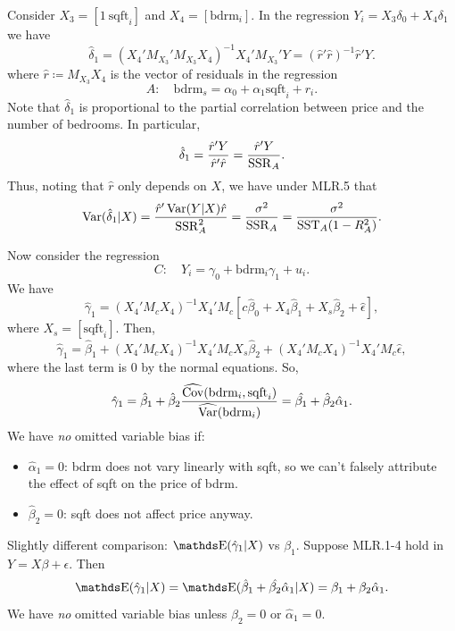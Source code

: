 \documentclass[letterpaper, 10pt]{article}
\begin{document}
\begin{example}
  Consider \(X_3 = [1 \  \text{sqft}_i]\) and \(X_4 = [\text{bdrm}_i]\).
  In the regression \(Y_i = X_3 \delta_0 + X_4 \delta_1\) we have
  \[
    \hat{\delta}_1
    = (X_4' M_{X_3}' M_{X_3} X_4)^{-1} X_4' M_{X_3}' Y
    = (\hat{r}' \hat{r})^{-1} \hat{r}' Y.
  \]
  where \(\hat{r} \coloneqq M_{X_3} X_4\) is the vector of residuals in the regression
  \[
    A: \quad \text{bdrm}_s = \alpha_0 + \alpha_1 \text{sqft}_i + r_i.
  \]
  Note that \(\hat{\delta}_1\) is proportional to the partial correlation between price and the number of bedrooms.
  In particular,
  \[
    \hat{\delta}_1
    = \frac{\hat{r}' Y}{\hat{r}' \hat{r}}
    = \frac{\hat{r}' Y}{\operatorname{SSR}_A}.
  \]
  Thus, noting that \(\hat{r}\) only depends on \(X\), we have under MLR.5 that
  \[
    \operatorname{Var}(\hat{\delta}_1 | X)
    = \frac{\hat{r}' \operatorname{Var}(Y|X) \hat{r}}{\operatorname{SSR}_A^2}
    = \frac{\sigma^2}{\operatorname{SSR}_A}
    = \frac{\sigma^2}{\operatorname{SST}_A(1 - R_A^2)}.
  \]

  Now consider the regression
  \[
    C:\quad
    Y_i = \gamma_0 + \text{bdrm}_i \gamma_1 + u_i.
  \]
  We have
  \[
    \hat{\gamma}_1 = (X_4' M_c X_4)^{-1} X_4' M_c [c \hat{\beta}_0 + X_4 \hat{\beta}_1 + X_s \hat{\beta}_2 + \hat{\epsilon}],
  \]
  where \(X_s = [\text{sqft}_i]\).
  Then,
  \[
    \hat{\gamma}_1
    = \hat{\beta}_1 + (X_4' M_c X_4)^{-1} X_4' M_c X_s \hat{\beta}_2 + (X_4' M_c X_4)^{-1} X_4' M_c \hat{\epsilon},
  \]
  where the last term is \(0\) by the normal equations.
  So,
  \[
    \hat{\gamma}_1
    = \hat{\beta}_1 + \hat{\beta}_2 \frac{\widehat{\operatorname{Cov}}(\text{bdrm}_i, \text{sqft}_i)}{\widehat{\operatorname{Var}}(\text{bdrm}_i)}
    = \hat{\beta_1} + \hat{\beta}_2 \hat{\alpha}_1.
  \]
  We have \emph{no} omitted variable bias if:
  \begin{itemize}
    \item \(\hat{\alpha}_1 = 0\): bdrm does not vary linearly with sqft, so we can't falsely attribute the effect of sqft on the price of bdrm.
    \item \(\hat{\beta}_2 = 0\): sqft does not affect price anyway.
  \end{itemize}

  Slightly different comparison: \(\E(\hat{\gamma}_1 | X)\) vs \(\beta_1\).
  Suppose MLR.1-4 hold in \(Y = X \beta + \epsilon\).
  Then
  \[
    \E(\hat{\gamma}_1 | X)
    = \E(\hat{\beta}_1 + \hat{\beta_2} \hat{\alpha}_1 | X)
    = \beta_1 + \beta_2 \hat{\alpha}_1.
  \]
  We have \emph{no} omitted variable bias unless \(\beta_2 = 0\) or \(\hat{\alpha}_1 = 0\).
\end{example}
\end{document}
